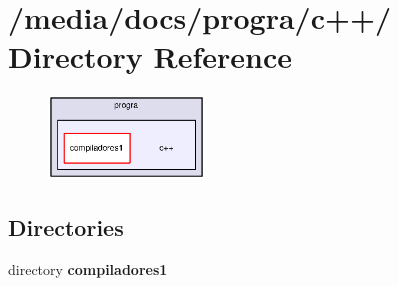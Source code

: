 \section{/media/docs/progra/c++/ Directory Reference}
\label{dir_000003}


\begin{figure}[H]
\begin{center}
\leavevmode
\includegraphics[width=118pt]{dir_000003_dep}
\end{center}
\end{figure}
\subsection*{Directories}
\begin{CompactItemize}
\item 
directory {\bf compiladores1}
\end{CompactItemize}
